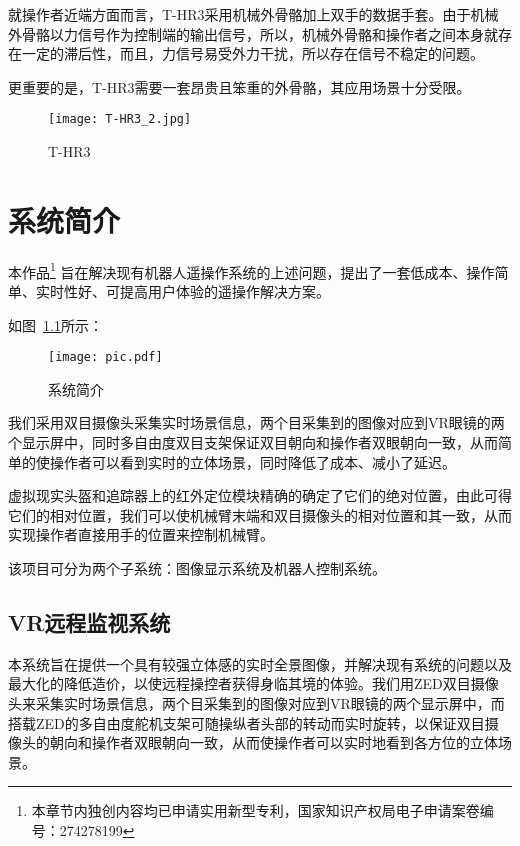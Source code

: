 就操作者近端方面而言，T-HR3采用机械外骨骼加上双手的数据手套。由于机械外骨骼以力信号作为控制端的输出信号，所以，机械外骨骼和操作者之间本身就存在一定的滞后性，而且，力信号易受外力干扰，所以存在信号不稳定的问题。

更重要的是，T-HR3需要一套昂贵且笨重的外骨骼，其应用场景十分受限。

\begin{figure}[htbp]
\small
\centering
\texttt{[image: T-HR3\_2.jpg]}
\caption{T-HR3} 
\label{thr}
\end{figure}




\chapter{系统简介}
本作品\footnote{本章节内独创内容均已申请实用新型专利，国家知识产权局电子申请案卷编号：274278199}
旨在解决现有机器人遥操作系统的上述问题，提出了一套低成本、操作简单、实时性好、可提高用户体验的遥操作解决方案。

如图~\ref{pic}所示：

\begin{figure}[htbp]
\small
\centering
\texttt{[image: pic.pdf]}
\caption{系统简介} 
\label{pic}
\end{figure}




我们采用双目摄像头采集实时场景信息，两个目采集到的图像对应到VR眼镜的两个显示屏中，同时多自由度双目支架保证双目朝向和操作者双眼朝向一致，从而简单的使操作者可以看到实时的立体场景，同时降低了成本、减小了延迟。

虚拟现实头盔和追踪器上的红外定位模块精确的确定了它们的绝对位置，由此可得它们的相对位置，我们可以使机械臂末端和双目摄像头的相对位置和其一致，从而实现操作者直接用手的位置来控制机械臂。


该项目可分为两个子系统：图像显示系统及机器人控制系统。
	
	\section{VR远程监视系统}
本系统旨在提供一个具有较强立体感的实时全景图像，并解决现有系统的问题以及最大化的降低造价，以使远程操控者获得身临其境的体验。我们用ZED双目摄像头来采集实时场景信息，两个目采集到的图像对应到VR眼镜的两个显示屏中，而搭载ZED的多自由度舵机支架可随操纵者头部的转动而实时旋转，以保证双目摄像头的朝向和操作者双眼朝向一致，从而使操作者可以实时地看到各方位的立体场景。
	
